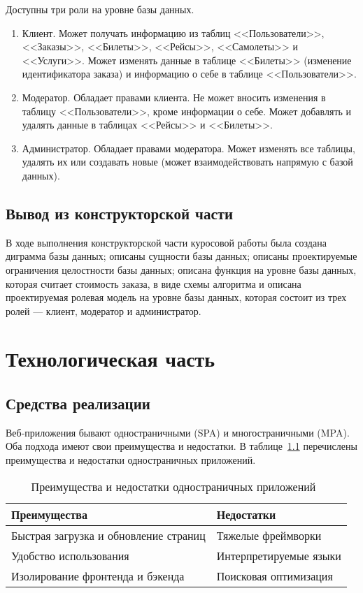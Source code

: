 \documentclass{bmstu}
\begin{document}
Доступны три роли на уровне базы данных.
\begin{enumerate}
\item Клиент. 
Может получать информацию из таблиц <<Пользователи>>, <<Заказы>>, <<Билеты>>, <<Рейсы>>, <<Самолеты>> и <<Услуги>>. 
Может изменять данные в таблице <<Билеты>> (изменение идентификатора заказа) и информацию о себе в таблице <<Пользователи>>.
\item Модератор. 
Обладает правами клиента. 
Не может вносить изменения в таблицу <<Пользователи>>, кроме информации о себе. 
Может добавлять и удалять данные в таблицах <<Рейсы>> и <<Билеты>>.
\item Администратор. 
Обладает правами модератора. 
Может изменять все таблицы, удалять их или создавать новые (может взаимодействовать напрямую с базой данных).
\end{enumerate}

\section*{Вывод из конструкторской части}

В ходе выполнения конструкторской части куросовой работы была создана диграмма базы данных; описаны сущности базы данных; описаны проектируемые ограничения целостности базы данных; описана функция на уровне базы данных, которая считает стоимость заказа, в виде схемы алгоритма и описана проектируемая ролевая модель на уровне базы данных, которая состоит из трех ролей --- клиент, модератор и администратор.

\chapter{Технологическая часть}

\section{Средства реализации}

Веб-приложения бывают одностраничными (SPA) и многостраничными (MPA). 
Оба подхода имеют свои преимущества и недостатки. 
В таблице~\ref{tabular:spa} перечислены преимущества и недостатки одностраничных приложений.

\begin{table}[H]
\caption{Преимущества и недостатки одностраничных приложений~\cite{Bekasov2023}}
\label{tabular:spa}
\begin{tabular}{|>{\raggedleft}p{8cm}|>{\raggedleft}p{8cm}|}
\hline
\textbf{Преимущества} & \textbf{Недостатки}
\tabularnewline
\hline
Быстрая загрузка и обновление страниц & Тяжелые фреймворки
\tabularnewline
\hline
Удобство использования & Интерпретируемые языки
\tabularnewline
\hline
Изолирование фронтенда и бэкенда & Поисковая оптимизация
\tabularnewline
\hline
\end{tabular}
\end{table}
\end{document}
